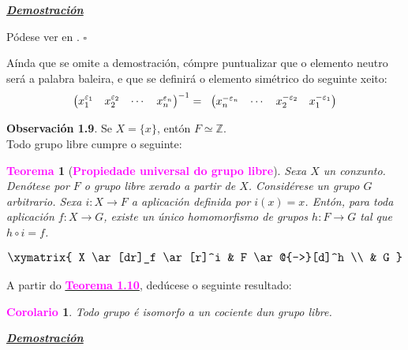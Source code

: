 \documentclass[twoside]{report}
\newcommand{\magbf}[1]{\textcolor{magenta}{\textbf{#1}}} %
\theoremstyle{mystyle}
\newtheorem{theo}{\magbf{Teorema}}[chapter]
\newtheorem{cor}{\magbf{Corolario}}[chapter]
\newenvironment{theorem}
{\begin{mdframed}[linecolor = magenta,backgroundcolor = classicrose, linewidth = 2mm]\begin{theo}}
{\end{theo}\end{mdframed}}
\newenvironment{corollary}
{\begin{mdframed}[linecolor = magenta,backgroundcolor = classicrose, linewidth = 2mm]\begin{cor}}
{\end{cor}\end{mdframed}}
\begin{document}
\noindent \textbf{\textit{\underline{Demostración}}}

\vspace{2mm}

\noindent Pódese ver en \cite{rotman}. $\square$

\vspace{3mm}

\noindent Aínda que se omite a demostración, cómpre puntualizar que o elemento neutro será a palabra baleira, e que se definirá o elemento simétrico do seguinte xeito:
$$\begin{pmatrix} x_{1}^{\varepsilon_{1}} & x_{2}^{\varepsilon_{2}} & \cdots & x_{n}^{\varepsilon_{n}}\end{pmatrix}^{-1} = \hspace{2mm} \begin{pmatrix} x_{n}^{-\varepsilon_{n}} & \cdots & x_{2}^{-\varepsilon_{2}} & x_{1}^{-\varepsilon_{1}}\end{pmatrix}$$

\noindent \textbf{Observación 1.9}. Se $X = \{x\}$, entón $F \simeq \mathbb{Z}$.\\

\noindent Todo grupo libre cumpre o seguinte: 

\begin{theorem}[\magbf{Propiedade universal do grupo libre}] \label{th1.11}
Sexa $X$ un conxunto. Denótese por $F$ o grupo libre xerado a partir de $X$. Considérese un grupo $G$ arbitrario. Sexa $i: X \longrightarrow F$ a aplicación definida por $i(x) = x$. Entón, para toda aplicación $f: X \longrightarrow G$, existe un único homomorfismo de grupos $h: F \longrightarrow G$ tal que $h \circ i = f$.
\end{theorem}

$$
     \large \xymatrix{
        X \ar[dr]_f \ar[r]^i & F \ar@{-->}[d]^h \\
          & G
    }    
$$

\vspace{3mm}

\noindent A partir do \hyperref[th1.10]{\magbf{Teorema 1.10}}, dedúcese o seguinte resultado: \\

\begin{corollary} \label{cor1.4}
Todo grupo é isomorfo a un cociente dun grupo libre.
\end{corollary}

\vspace{2mm}

\noindent \textbf{\textit{\underline{Demostración}}}
\end{document}
